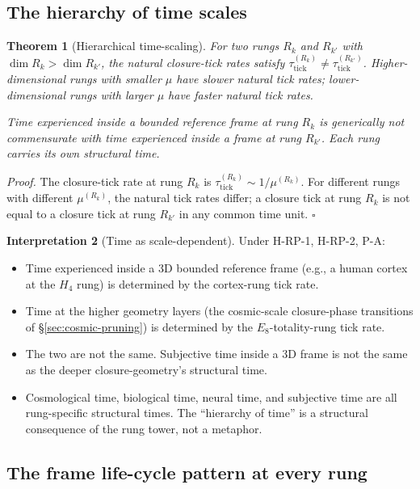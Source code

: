\documentclass[11pt]{article}
\theoremstyle{plain}
\newtheorem{theorem}{Theorem}[section]
\theoremstyle{definition}
\newtheorem{interpretation}[theorem]{Interpretation}
\theoremstyle{remark}
\begin{document}
\subsection{The hierarchy of time scales}

\begin{theorem}[Hierarchical time-scaling]\label{thm:hierarchical-time}
For two rungs $R_k$ and $R_{k'}$ with $\dim R_k > \dim R_{k'}$, the natural closure-tick rates satisfy $\tau_{\mathrm{tick}}^{(R_k)} \neq \tau_{\mathrm{tick}}^{(R_{k'})}$. Higher-dimensional rungs with smaller $\mu$ have slower natural tick rates; lower-dimensional rungs with larger $\mu$ have faster natural tick rates.

Time experienced inside a bounded reference frame at rung $R_k$ is generically not commensurate with time experienced inside a frame at rung $R_{k'}$. Each rung carries its own structural time.
\end{theorem}

\noindent\emph{Proof.} The closure-tick rate at rung $R_k$ is $\tau_{\mathrm{tick}}^{(R_k)} \sim 1 / \mu^{(R_k)}$. For different rungs with different $\mu^{(R_k)}$, the natural tick rates differ; a closure tick at rung $R_k$ is not equal to a closure tick at rung $R_{k'}$ in any common time unit. \hfill$\square$

\begin{interpretation}[Time as scale-dependent]\label{int:scale-dep-time}
Under H-RP-1, H-RP-2, P-A:
\begin{itemize}[leftmargin=2em]
\item Time experienced inside a 3D bounded reference frame (e.g., a human cortex at the $H_4$ rung) is determined by the cortex-rung tick rate.
\item Time at the higher geometry layers (the cosmic-scale closure-phase transitions of \S\ref{sec:cosmic-pruning}) is determined by the $E_8$-totality-rung tick rate.
\item The two are not the same. Subjective time inside a 3D frame is not the same as the deeper closure-geometry's structural time.
\item Cosmological time, biological time, neural time, and subjective time are all rung-specific structural times. The ``hierarchy of time'' is a structural consequence of the rung tower, not a metaphor.
\end{itemize}
\end{interpretation}

\subsection{The frame life-cycle pattern at every rung}
\end{document}
